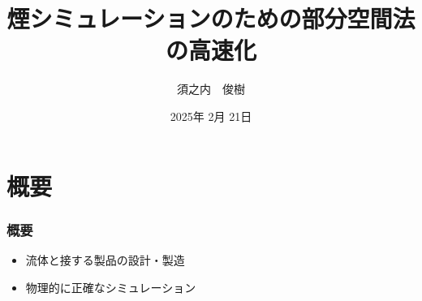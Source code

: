 \documentclass[aspectratio=169,dvipdfmx,hyperref={bookmarks=true}]{beamer}
\title{煙シミュレーションのための部分空間法の高速化}
\author{須之内　俊樹}
\institute{中央大学理工学研究科　情報工学専攻　\\形状情報処理研究室　23N8100018B}
\date{2025年 2月 21日}
\begin{document}
   \begin{frame}
 \maketitle
 \end{frame} 
     \section{概要}
 \begin{frame}
 \frametitle{概要}
  \begin{block}{}
  \begin{itemize}
	\item 流体と接する製品の設計・製造
	\item 物理的に正確なシミュレーション
\end{itemize}
\end{block}

 \end{frame}
\end{document}

